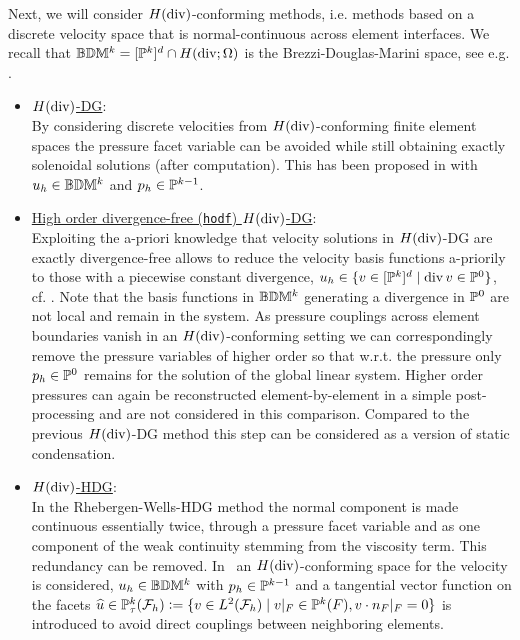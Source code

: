 \documentclass[pdflatex,sn-mathphys,Numbered]{sn-jnl}%
\renewcommand{\hat}[1]{\widehat{#1}}
\theoremstyle{remark}%
\theoremstyle{definition}%
\begin{document}
%
Next, we will consider $H(\operatorname{\mathrm{div}})$-conforming methods, i.e. methods based on a discrete velocity space that is normal-continuous across element interfaces.
We recall that $\mathbb{B}\mathbb{D}\mathbb{M}^{k}= [\mathbb{P}^k]^d \cap H(\operatorname{\mathrm{div}};\Omega)$ is the Brezzi-Douglas-Marini space, see e.g. \cite[Section 2.3.1]{brezzi}.
\begin{itemize}
  \item \underline{$H(\operatorname{\mathrm{div}})$-DG}: \\[0.4ex] By considering discrete velocities from $H(\operatorname{\mathrm{div}})$-conforming finite element spaces the pressure facet variable can be avoided while still obtaining exactly solenoidal solutions (after computation). This has been proposed in \cite{cockburn2007note} with $u_h \in \mathbb{B}\mathbb{D}\mathbb{M}^k$ and $p_h \in \mathbb{P}^{k-1}$. %
  \item \underline{High order divergence-free (\texttt{hodf}) $H(\operatorname{\mathrm{div}})$-DG}: \\[0.4ex] Exploiting the a-priori knowledge that velocity solutions in $H(\operatorname{\mathrm{div}})$-DG are exactly divergence-free allows to reduce the velocity basis functions a-priorily to those with a piecewise constant divergence, $u_h \in \{v \in [\mathbb{P}^k]^d \mid \operatorname{\mathrm{div}} v \in \mathbb{P}^0 \}$, cf. \cite{zaglmayr2006high}. Note that the basis functions in $\mathbb{B}\mathbb{D}\mathbb{M}^k$ generating a divergence in $\mathbb{P}^0$ are not local and remain in the system. As pressure couplings across element boundaries vanish in an $H(\operatorname{\mathrm{div}})$-conforming setting we can correspondingly remove the pressure variables of higher order so that w.r.t. the pressure only $p_h \in \mathbb{P}^0$ remains for the solution of the global linear system. Higher order pressures can again be reconstructed element-by-element in a simple post-processing and are not considered in this comparison. Compared to the previous $H(\operatorname{\mathrm{div}})$-DG method this step can be considered as a version of static condensation. 
  \item \underline{$H(\operatorname{\mathrm{div}})$-HDG}: \\[0.4ex] In the Rhebergen-Wells-HDG method the normal component is made continuous essentially twice, through a pressure facet variable and as one component of the weak continuity stemming from the viscosity term. This redundancy can be removed. In~\cite{LS_CMAME_2016} an $H(\operatorname{\mathrm{div}})$-conforming space for the velocity is considered, $u_h \in \mathbb{B}\mathbb{D}\mathbb{M}^k$ with $p_h \in \mathbb{P}^{k-1}$ and a tangential vector function on the facets $\hat{u} \in \PP_\tau^k(\Fh) := \{ v \in L^2(\Fh)  \mid v|_F \in \PP^k(F), v \cdot n_F |_F = 0 \}$ is introduced to avoid direct couplings between neighboring elements.

\end{itemize}
\end{document}
